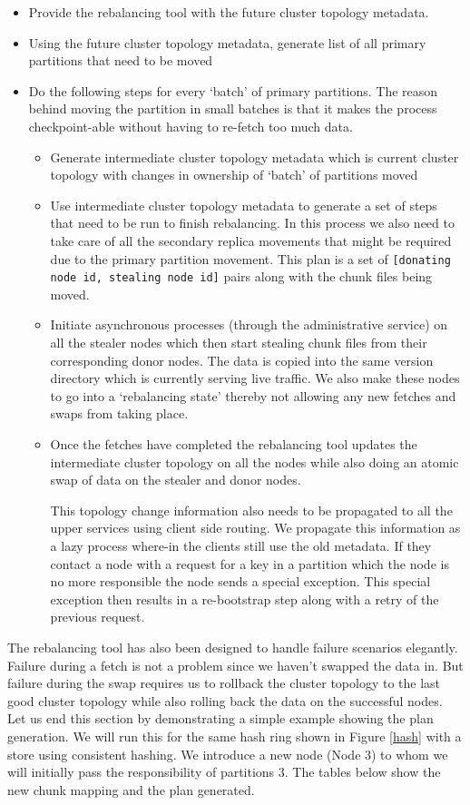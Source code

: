 \documentclass[10pt,twocolumn,preprint,natbib,authoryear]{sigplanconf}
\begin{document}
\begin{itemize}
	\item Provide the rebalancing tool with the future cluster topology metadata.
	\item Using the future cluster topology metadata, generate list of all primary partitions that need to be moved
	\item Do the following steps for every `batch' of primary partitions. The reason behind moving the partition in small batches is that it makes the process checkpoint-able without having to re-fetch too much data. 
		\begin{itemize}
			\item Generate intermediate cluster topology metadata which is current cluster topology with changes in ownership of `batch' of partitions moved
			\item Use intermediate cluster topology metadata to generate a set of steps that need to be run to finish rebalancing. In this process we also need to take care of all the secondary replica movements that might be required due to the primary partition movement. This plan is a set of \verb=[donating node id, stealing node id]= pairs along with the chunk files being moved. 
			\item Initiate asynchronous processes (through the administrative service) on all the stealer nodes which then start stealing chunk files from their corresponding donor nodes. The data is copied into the same version directory which is currently serving live traffic. We also make these nodes to go into a `rebalancing state' thereby not allowing any new fetches and swaps from taking place. 
			\item Once the fetches have completed the rebalancing tool updates the intermediate cluster topology on all the nodes while also doing an atomic swap of data on the stealer and donor nodes. 
			
			This topology change information also needs to be propagated to all the upper services using client side routing. We propagate this information as a lazy process where-in the clients still use the old metadata. If they contact a node with a request for a key in a partition which the node is no more responsible the node sends a special exception. This special exception then results in a re-bootstrap step along with a retry of the previous request.
		\end{itemize}
\end{itemize}

The rebalancing tool has also been designed to handle failure scenarios elegantly. Failure during a fetch is not a problem since we haven't swapped the data in. But failure during the swap requires us to rollback the cluster topology to the last good cluster topology while also rolling back the data on the successful nodes. Let us end this section by demonstrating a simple example showing the plan generation. We will run this for the same hash ring shown in Figure \ref{hash} with a store using consistent hashing. We introduce a new node (Node 3) to whom we will initially pass the responsibility of partitions 3. The tables below show the new chunk mapping and the plan generated. 
\end{document}
